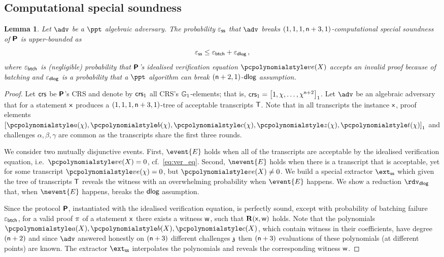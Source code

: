 \let\accentvec\vec \documentclass[runningheads,10pt]{llncs}
\newtheorem{lemma}[theorem]{Lemma}
\begin{document}
\subsection{Computational special soundness}
\begin{lemma}
	\label{lem:plonkprot_ss}
	Let $\adv$ be a $\ppt$ algebraic adversary. The probability $\varepsilon_{\mathsf{ss}}$ that $\adv$ breaks 
	 $(1, 1, 1, \mathsf{n} + 3, 1)$-computational special soundness of $\bm{\mathsf{P}}$ is upper-bounded as
	 \[
	 	\varepsilon_{\mathsf{ss}} \leq \varepsilon_{\mathsf{btch}} + \varepsilon_{\mathsf{dlog}}\,,
	 \] 
	 where $\varepsilon_{\mathsf{btch}}$ is (negligible) probability that $\bm{\mathsf{P}}$'s idealised verification equation $\vereq(X)$ accepts an invalid proof because of batching and $\varepsilon_{\mathsf{dlog}}$ is a probability that a $\ppt$ algorithm can break $(\mathsf{n} + 2, 1)$-$\mathsf{dlog}$ assumption.
\end{lemma}
\begin{proof}
	Let $\mathsf{crs}$ be $\bm{\mathsf{P}}$'s CRS and denote by $\mathsf{crs}_1$ all CRS's $\mathbb{G}_1$-elements; that is, $\mathsf{crs}_1 = \left[1, \chi, \ldots, \chi^{\mathsf{n} + 2}\right]_{1}$. 
	Let $\adv$ be an algebraic adversary that for a statement $\mathsf{x}$ produces a $(1, 1, 1, \mathsf{n} + 3, 1)$-tree of acceptable transcripts $\mathsf{T}$. %
	Note that in all transcripts the instance $\mathsf{x}$, proof elements $\gone{\p{a}(\chi), \p{b}(\chi), \p{c}(\chi), \p{z}(\chi), \p{t}(\chi)}$ and challenges $\alpha, \beta, \gamma$ are common as the transcripts share the first three rounds. 
	
	We consider two mutually disjunctive events. 
	First, $\event{E}$ holds when all of the transcripts are acceptable by the idealised verification equation, i.e.~$\vereq(X) = 0$, cf.~\cref{eq:ver_eq}.
	Second, $\nevent{E}$ holds when there is a transcript that is acceptable, yet 
	for some transcript $\vereq(\chi) = 0$, but $\vereq(X) \neq 0$.
	We build a special extractor $\extss$ which given the tree of transcripts $\mathsf{T}$ reveals the witness with an overwhelming probability when $\event{E}$ happens. 
	We show a reduction $\rdvdlog$ that, when $\nevent{E}$ happens, breaks the $\mathsf{dlog}$ assumption. 
	
	  Since the protocol $\bm{\mathsf{P}}$,
	instantiated with the idealised verification equation, is perfectly sound,
	except with probability of batching failure $\varepsilon_{\mathsf{btch}}$, for a valid proof
	$\pi$ of a statement $\mathsf{x}$ there exists a witness $\mathsf{w}$, such that
	$\mathbf{R}(\mathsf{x}, \mathsf{w})$ holds.  Note that the polynomials $\p{a}(X),
	\p{b}(X), \p{c}(X)$, which contain witness in their coefficients, have degree $(\mathsf{n} + 2)$ and since $\adv$
	answered honestly on $(\mathsf{n} + 3)$ different challenges $\mathfrak{z}$
	then $(\mathsf{n} + 3)$ evaluations of these polynomials (at
	different points) are known. The extractor $\extss$ interpolates the
	polynomials and reveals the corresponding witness $\mathsf{w}$.


\end{proof}
\end{document}
